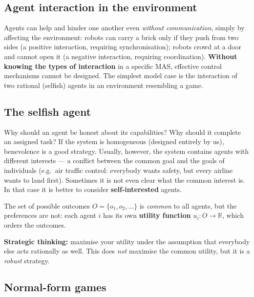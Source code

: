 \documentclass[11pt,a4paper]{article}
\theoremstyle{definition}
\begin{document}
\subsection{Agent interaction in the environment}

Agents can help and hinder one another even \emph{without communication}, simply by affecting
the environment: robots can carry a brick only if they push from two sides (a positive
interaction, requiring synchronisation); robots crowd at a door and cannot open it (a negative
interaction, requiring coordination). \textbf{Without knowing the types of interaction} in a
specific MAS, effective control mechanisms cannot be designed. The simplest model case is the
interaction of two rational (selfish) agents in an environment resembling a game.
\subsection{The selfish agent}

Why should an agent be honest about its capabilities? Why should it complete an assigned task?
If the system is homogeneous (designed entirely by us), benevolence is a good strategy. Usually,
however, the system contains agents with different interests --- a conflict between the common goal
and the goals of individuals (e.g.\ air traffic control: everybody wants safety, but every airline
wants to land first). Sometimes it is not even clear what the common interest is. In that case it is
better to consider \textbf{self-interested} agents.

\begin{defbox}
The set of possible outcomes $O = \{o_1, o_2, \dots\}$ is \emph{common} to all agents,
but the preferences are not: each agent $i$ has its own \textbf{utility function}
$u_i : O \to \mathbb{R}$, which orders the outcomes.

\textbf{Strategic thinking:} maximise your utility under the assumption that everybody else acts
rationally as well. This does \emph{not} maximise the common utility, but it is a \emph{robust}
strategy.
\end{defbox}

\subsection{Normal-form games}
\end{document}
